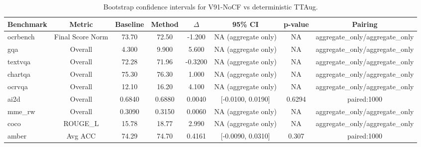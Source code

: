 \begin{table}[t]
\centering
\begin{tabular}{lccccccc}
\toprule
Benchmark & Metric & Baseline & Method & $\Delta$ & 95\% CI & p-value & Pairing \\
\midrule
ocrbench & Final Score Norm & 73.70 & 72.50 & -1.200 & NA (aggregate only) & NA & aggregate_only/aggregate_only \\
gqa & Overall & 4.300 & 9.900 & 5.600 & NA (aggregate only) & NA & aggregate_only/aggregate_only \\
textvqa & Overall & 72.28 & 71.96 & -0.3200 & NA (aggregate only) & NA & aggregate_only/aggregate_only \\
chartqa & Overall & 75.30 & 76.30 & 1.000 & NA (aggregate only) & NA & aggregate_only/aggregate_only \\
ocrvqa & Overall & 12.10 & 16.20 & 4.100 & NA (aggregate only) & NA & aggregate_only/aggregate_only \\
ai2d & Overall & 0.6840 & 0.6880 & 0.0040 & [-0.0100, 0.0190] & 0.6294 & paired:1000 \\
mme_rw & Overall & 0.3090 & 0.3150 & 0.0060 & NA (aggregate only) & NA & aggregate_only/aggregate_only \\
coco & ROUGE_L & 15.78 & 18.77 & 2.990 & NA (aggregate only) & NA & aggregate_only/aggregate_only \\
amber & Avg ACC & 74.29 & 74.70 & 0.4161 & [-0.0090, 0.0310] & 0.307 & paired:1000 \\
\bottomrule
\end{tabular}
\caption{Bootstrap confidence intervals for V91-NoCF vs deterministic TTAug.}
\label{tab:bootstrap_main}
\end{table}
